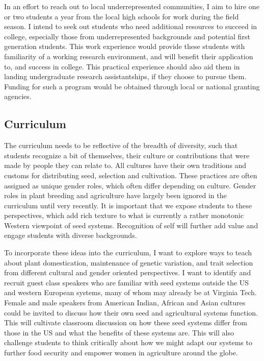 \documentclass[11pt]{article}
\begin{document}
In an effort to reach out to local underrepresented communities, I aim to hire one or two students a year from the local high schools for work during the field season. I intend to seek out students who need additional resources to succeed in college, especially those from underrepresented backgrounds and potential first generation students. This work experience would provide these students with familiarity of a working research environment, and will benefit their application to, and success in college. This practical experience should also aid them in landing undergraduate research assistantships, if they choose to pursue them. Funding for such a program would be obtained through local or national granting agencies.

\subsection*{Curriculum}

The curriculum needs to be reflective of the breadth of diversity, such that students recognize a bit of themselves, their culture or contributions that were made by people they can relate to. All cultures have their own traditions and customs for distributing seed, selection and cultivation. These practices are often assigned as unique gender roles, which often differ depending on culture. Gender roles in plant breeding and agriculture have largely been ignored in the curriculum until very recently. It is important that we expose students to these perspectives, which add rich texture to what is currently a rather monotonic Western viewpoint of seed systems. Recognition of self will further add value and engage students with diverse backgrounds.

To incorporate these ideas into the curriculum, I want to explore ways to teach about plant domestication, maintenance of genetic variation, and trait selection from different cultural and gender oriented perspectives. I want to identify and recruit guest class speakers who are familiar with seed systems outside the US and western European systems, many of whom may already be at Virginia Tech. Female and male speakers from American Indian, African and Asian cultures could be invited to discuss how their own seed and agricultural systems function. This will cultivate classroom discussion on how these seed systems differ from those in the US and what the benefits of these systems are. This will also challenge students to think critically about how we might adapt our systems to further food security and empower women in agriculture around the globe. 
\end{document}
